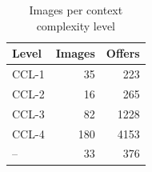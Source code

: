 \begin{table}[t]
\centering
\caption{Images per context complexity level}
\label{tab:ccl}
\small
\begin{tabular}{lrr}
\toprule
Level & Images & Offers \\
\midrule
CCL-1 & 35 & 223 \\
CCL-2 & 16 & 265 \\
CCL-3 & 82 & 1228 \\
CCL-4 & 180 & 4153 \\
– & 33 & 376 \\
\bottomrule
\end{tabular}
\end{table}
